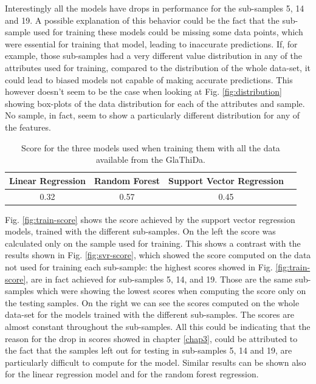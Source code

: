 Interestingly all the models have drops in performance for the sub-samples  5, 14 and 19. A possible explanation of this behavior could be the fact that the sub-sample used for training these models could be missing some data points, which were essential for training that model, leading to inaccurate predictions. If, for example, those sub-samples had a very different value distribution in any of the attributes used for training, compared to the distribution of the whole data-set, it could lead to biased models not capable of making accurate predictions. This however doesn't seem to be the case when looking at Fig. \ref{fig:distribution} showing box-plots of the data distribution for each of the attributes and sample. No sample, in fact, seem to show a particularly different distribution for any of the features.

\begin{table}[!b]
	\centering
	\caption{Score for the three models used when training them with all the data available from the GlaThiDa.}
	\begin{tabular}{|c|c|c|c|}
		\hline 
		Linear Regression&Random Forest&Support Vector Regression \\
		\hline
		0.32&0.57&0.45 \\
		\hline
	\end{tabular}
	\label{tb:all-score}
\end{table}

Fig. \ref{fig:train-score} shows the score achieved by the support vector regression models, trained with the different sub-samples. On the left the score was calculated only on the sample used for training. This shows a contrast with the results shown in Fig. \ref{fig:svr-score}, which showed the score computed on the data not used for training each sub-sample: the highest scores showed in Fig. \ref{fig:train-score}, are in fact achieved for sub-samples 5, 14, and 19. Those are the same sub-samples which were showing the lowest scores when computing the score only on the testing samples. On the right we can see the scores computed on the whole data-set for the models trained with the different sub-samples. The scores are almost constant throughout the sub-samples. All this could be indicating that the reason for the drop in scores showed in chapter \ref{chap3}, could be attributed to the fact that the samples left out for testing in sub-samples 5, 14 and 19, are particularly difficult to compute for the model. Similar results can be shown also for the linear regression model and for the random forest regression.


